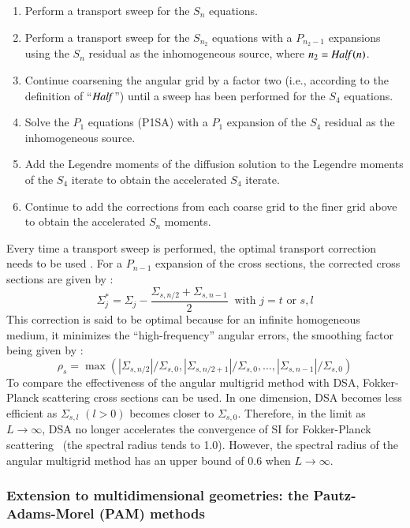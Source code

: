 \documentclass[preprint,10pt]{elsarticle}
\renewcommand{\(}{\left(}
\renewcommand{\)}{\right)}
\renewcommand{\[}{\left[}
\renewcommand{\]}{\right]}
\newcommand{\Half}{\text{\it Half\,}}
\begin{document}
\begin{enumerate}
\item Perform a transport sweep for the $S_n$ equations.
\item Perform a transport sweep for the $S_{n_2}$ equations with a $P_{n_2-1}$
expansions using the $S_n$ residual as the inhomogeneous source, where
$n_2=\Half(n)$.
\item Continue coarsening the angular grid by a factor two (i.e., according to
the definition of ``$\Half$'') until a sweep has been performed for the $S_4$
equations.
\item Solve the $P_1$ equations (P1SA) with a $P_1$ expansion of the $S_4$
residual as the inhomogeneous source.
\item Add the Legendre moments of the diffusion solution to the Legendre
moments of the $S_4$ iterate to obtain the accelerated $S_4$ iterate.
\item Continue to add the corrections from each coarse grid to the finer grid
above to obtain the accelerated $S_n$ moments.
\end{enumerate}
%
Every time a transport sweep is performed, the optimal transport correction
needs to be used \cite{multigrid_1d}. For a $P_{n-1}$ expansion of the cross
sections, the corrected cross sections are given by :
%
\begin{equation}
\Sigma_{j}^* = \Sigma_{j} -\frac{\Sigma_{s,n/2}+\Sigma_{s,n-1}}{2}\ 
\textrm{ with }j=t \textrm{ or }s,l
\end{equation}
%
This correction is said to be optimal because for an infinite homogeneous medium, 
it minimizes the ``high-frequency'' angular errors, the smoothing factor being 
given by :
%
\begin{equation}
\rho_s =
\max(|\Sigma_{s,n/2}|/\Sigma_{s,0},|\Sigma_{s,n/2+1}|/\Sigma_{s,0},\hdots,
|\Sigma_{s,n-1}|/\Sigma_{s,0})
\end{equation}
%
To compare the effectiveness of the angular multigrid method with DSA, 
Fokker-Planck scattering cross sections can be used. In one dimension,
DSA becomes less efficient as $\Sigma_{s,l}$ $(l>0)$ becomes closer to
$\Sigma_{s,0}$. Therefore, in the limit as $L\rightarrow \infty$, DSA no
longer accelerates the convergence of SI for Fokker-Planck scattering \
(the spectral radius tends to 1.0). However, the spectral radius of the
angular multigrid method has an upper bound of 0.6 when $L\rightarrow \infty$.


\subsubsection{Extension to multidimensional geometries: the Pautz-Adams-Morel (PAM) methods}
\end{document}

